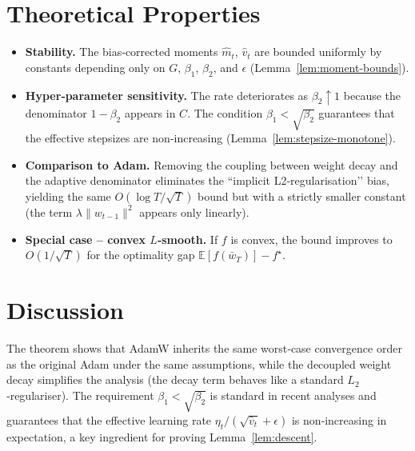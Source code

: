 \documentclass{article}
\newcommand{\EE}{\mathbb{E}}
\begin{document}
\section*{Theoretical Properties}
\begin{itemize}
    \item \textbf{Stability.} The bias‑corrected moments $\hat m_t$, $\hat v_t$ are bounded uniformly by constants depending only on $G$, $\beta_1$, $\beta_2$, and $\epsilon$ (Lemma~\ref{lem:moment-bounds}).
    \item \textbf{Hyper‑parameter sensitivity.} The rate deteriorates as $\beta_2\!\uparrow\!1$ because the denominator $1-\beta_2$ appears in $C$. The condition $\beta_1<\sqrt{\beta_2}$ guarantees that the effective stepsizes are non‑increasing (Lemma~\ref{lem:stepsize-monotone}).
    \item \textbf{Comparison to Adam.} Removing the coupling between weight decay and the adaptive denominator eliminates the “implicit L2‑regularisation’’ bias, yielding the same $O(\log T/\sqrt{T})$ bound but with a strictly smaller constant (the term $\lambda\|w_{t-1}\|^2$ appears only linearly).
    \item \textbf{Special case – convex $L$‑smooth.} If $f$ is convex, the bound improves to $O(1/\sqrt{T})$ for the optimality gap $\EE[f(\bar w_T)]-f^\star$.
\end{itemize}

\section*{Discussion}
The theorem shows that AdamW inherits the same worst‑case convergence order as the original Adam under the same assumptions, while the decoupled weight decay simplifies the analysis (the decay term behaves like a standard $L_2$‑regulariser). The requirement $\beta_1<\sqrt{\beta_2}$ is standard in recent analyses and guarantees that the effective learning rate $\eta_t/(\sqrt{\hat v_t}+\epsilon)$ is non‑increasing in expectation, a key ingredient for proving Lemma~\ref{lem:descent}.

\end{document}
